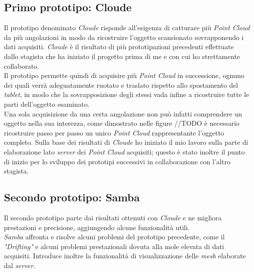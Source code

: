 \subsection{Primo prototipo: Cloude}
Il prototipo denominato \emph{Cloude} risponde all'esigenza di catturare più \emph{Point Cloud} da più angolazioni in modo da ricostruire l'oggetto scansionato sovrapponendo i dati acquisiti. \emph{Cloude} è il risultato di più prototipazioni precedenti effettuate dallo stagista che ha iniziato il progetto prima di me e con cui ho strettamente collaborato.\\
Il prototipo permette quindi di acquisire più \emph{Point Cloud} in successione, ognuno dei quali verrà adeguatamente ruotato e traslato rispetto allo spostamento del \emph{tablet}, in modo che la sovrapposizione degli stessi vada infine a ricostruire tutte le parti dell'oggetto esaminato.\\
Una sola acquisizione da una certa angolazione non può infatti comprendere un oggetto nella sua interezza, come dimostrato nelle figure //TODO
 è necessario ricostruire passo per passo un unico \emph{Point Cloud} rappresentante l'oggetto completo.
Sulla base dei risultati di \emph{Cloude} ho iniziato il mio lavoro sulla parte di elaborazione lato \emph{server} dei \emph{Point Cloud} acquisiti; questo è stato inoltre il punto di inizio per lo sviluppo dei prototipi successivi in collaborazione con l'altro stagista.

\subsection{Secondo prototipo: Samba}
Il secondo prototipo parte dai risultati ottenuti con \emph{Cloude} e ne migliora prestazioni e precisione, aggiungendo alcune funzionalità utili. \\
\emph{Samba} affronta e risolve alcuni problemi del prototipo precedente, come il \emph{"Drifting"} e alcuni problemi prestazionali dovuta alla mole elevata di dati acquisiti. Introduce inoltre la funzionalità di visualizzazione delle \emph{mesh} elaborate dal \emph{server}.

